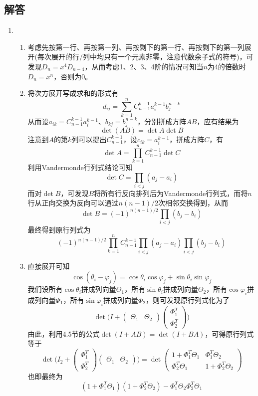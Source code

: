 \documentclass[a4paper,UTF8,fontset=windows]{ctexart}
\begin{document}
\subsection{解答}
\begin{enumerate}
    \item
    \begin{enumerate}[(1)]
        \item 考虑先按第一行、再按第一列、再按剩下的第一行、再按剩下的第一列展开(每次展开的行/列中均只有一个元素非零，注意代数余子式的符号)，可发现$D_n=x^4D_{n-4}$，从而考虑1、2、3、4阶的情况可知当$n$为4的倍数时$D_n=x^n$，否则为0。
        
        \item 将次方展开写成求和的形式有
        $$d_{ij}=\sum_{k=1}^nC_{n-1}^{k-1}a_i^{k-1}b_j^{n-k}$$
        从而设$a_{ik}=C_{n-1}^{k-1}a_i^{k-1}$、$b_{kj}=b_j^{n-k}$，分别拼成方阵$AB$，应有结果为
        $$\det(AB)=\det A\det B$$
        注意到$A$的第$k$列可以提出$C_{n-1}^{k-1}$，设$c_{ik}=a_i^{k-1}$，拼成方阵$C$，有
        $$\det A=\prod_{k=1}^nC_{n-1}^{k-1}\det C$$
        利用Vandermonde行列式结论可知
        $$\det C=\prod_{i<j}(a_j-a_i)$$
        而对$\det B$，可发现$B$将所有行反向排列后为Vandermonde行列式，而将$n$行从正向交换为反向可以通过$n(n-1)/2$次相邻交换得到，从而
        $$\det B=(-1)^{n(n-1)/2}\prod_{i<j}(b_j-b_i)$$
        最终得到原行列式为
        $$(-1)^{n(n-1)/2}\prod_{k=1}^nC_{n-1}^{k-1}\prod_{i<j}(a_j-a_i)\prod_{i<j}(b_j-b_i)$$

        \item
        直接展开可知
        $$\cos(\theta_i-\varphi_j)=\cos\theta_i\cos\varphi_j+\sin\theta_i\sin\varphi_j$$
        我们设所有$\cos\theta_i$拼成列向量$\Theta_1$，所有$\sin\theta_i$拼成列向量$\Theta_2$，所有$\cos\varphi_i$拼成列向量$\Phi_1$，所有$\sin\varphi_i$拼成列向量$\Phi_2$，则可发现原行列式化为了
        $$\det\bigg(I+\begin{pmatrix}\Theta_1&\Theta_2\end{pmatrix}\begin{pmatrix}\Phi_1^T\\\Phi_2^T\end{pmatrix}\bigg)$$
        由此，利用4.5节的公式$\det(I+AB)=\det(I+BA)$，可得原行列式等于
        $$\det\bigg(I_2+\begin{pmatrix}\Phi_1^T\\\Phi_2^T\end{pmatrix}\begin{pmatrix}\Theta_1&\Theta_2\end{pmatrix}\bigg)=\det\begin{pmatrix}1+\Phi_1^T\Theta_1&\Phi_1^T\Theta_2\\\Phi_2^T\Theta_1&1+\Phi_2^T\Theta_2\end{pmatrix}$$
        也即最终为
        $$(1+\Phi_1^T\Theta_1)(1+\Phi_2^T\Theta_2)-\Phi_1^T\Theta_2\Phi_2^T\Theta_1$$


\end{enumerate}
\end{enumerate}
\end{document}
